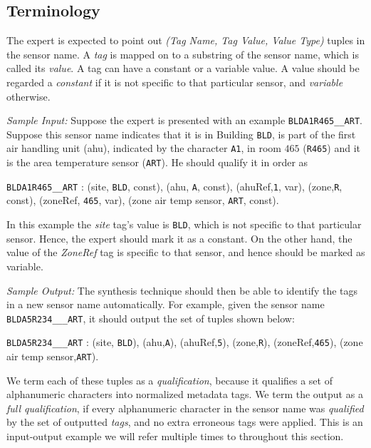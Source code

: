 \subsection{Terminology}

The expert is expected to point out \emph{(Tag Name, Tag Value, Value Type)} tuples in the sensor name. A {\it tag} is mapped on to a substring of the sensor name, which is called its {\it value}. A tag can have a constant or a variable value. A value should be regarded a \emph{constant} if it is not specific to that particular sensor, and \emph{variable} otherwise.

{\it Sample Input:} Suppose the expert is presented with an example \texttt{BLDA1R465\_\_ART}. Suppose this sensor name indicates that it is in Building \texttt{BLD}, is part of the first air handling unit (ahu), indicated by the character \texttt{A1}, in room $465$ (\texttt{R465}) and it is the area temperature sensor (\texttt{ART}). He should qualify it in order as

 \texttt{BLDA1R465\_\_ART} : (site, \texttt{BLD}, const), (ahu, \texttt{A}, const), (ahuRef,\texttt{1}, var), (zone,\texttt{R}, const), (zoneRef, \texttt{465}, var), (zone air temp sensor, \texttt{ART}, const). 

In this example the {\it site} tag's value is \texttt{BLD}, which is not specific to that particular sensor. Hence, the expert should mark it as a constant. On the other hand, the value of the {\it ZoneRef} tag is specific to that sensor, and hence should be marked as variable.

{\it Sample Output:} The synthesis technique should then be able to identify the tags in a new sensor name automatically. For example, given the sensor name \texttt{BLDA5R234\_\_\_ART}, it should output the set of tuples shown below:

\texttt{BLDA5R234\_\_\_ART} : (site, \texttt{BLD}), (ahu,\texttt{A}), (ahuRef,\texttt{5}), (zone,\texttt{R}), (zoneRef,\texttt{465}), (zone air temp sensor,\texttt{ART}).

We term each of these tuples as a {\it qualification}, because it qualifies a set of alphanumeric characters into normalized metadata tags. We term the output as a {\it full qualification}, if every alphanumeric character in the sensor name was {\it qualified} by the set of outputted {\it tags}, and no extra erroneous tags were applied. This is an input-output example we will refer multiple times to throughout this section.

